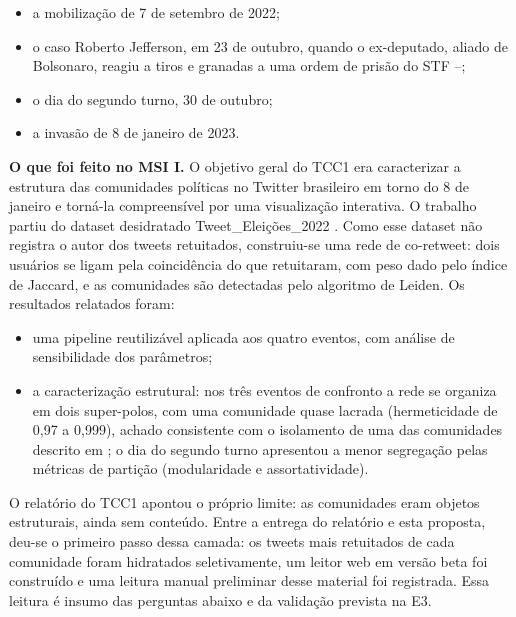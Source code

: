 \documentclass[12pt,a4paper,oneside]{article}
\begin{document}
\begin{itemize}
\item a mobilização de 7 de setembro de 2022;
\item o caso Roberto Jefferson, em 23 de outubro, quando o ex-deputado, aliado de Bolsonaro, reagiu a tiros e granadas a uma ordem de prisão do STF \cite{stf2022}–\cite{poder2022};
\item o dia do segundo turno, 30 de outubro;
\item a invasão de 8 de janeiro de 2023.
\end{itemize}

\textbf{O que foi feito no MSI I.} O objetivo geral do TCC1 era caracterizar a estrutura das comunidades políticas no Twitter brasileiro em torno do 8 de janeiro e torná-la compreensível por uma visualização interativa. O trabalho partiu do dataset desidratado Tweet\_Eleições\_2022 \cite{alabarse2024}. Como esse dataset não registra o autor dos tweets retuitados, construiu-se uma rede de co-retweet: dois usuários se ligam pela coincidência do que retuitaram, com peso dado pelo índice de Jaccard, e as comunidades são detectadas pelo algoritmo de Leiden. Os resultados relatados foram:

\begin{itemize}
\item uma pipeline reutilizável aplicada aos quatro eventos, com análise de sensibilidade dos parâmetros;
\item a caracterização estrutural: nos três eventos de confronto a rede se organiza em dois super-polos, com uma comunidade quase lacrada (hermeticidade de 0,97 a 0,999), achado consistente com o isolamento de uma das comunidades descrito em \cite{interian2023}; o dia do segundo turno apresentou a menor segregação pelas métricas de partição (modularidade e assortatividade).
\end{itemize}

O relatório do TCC1 apontou o próprio limite: as comunidades eram objetos estruturais, ainda sem conteúdo. Entre a entrega do relatório e esta proposta, deu-se o primeiro passo dessa camada: os tweets mais retuitados de cada comunidade foram hidratados seletivamente, um leitor web em versão beta foi construído e uma leitura manual preliminar desse material foi registrada. Essa leitura é insumo das perguntas abaixo e da validação prevista na E3.
\end{document}
